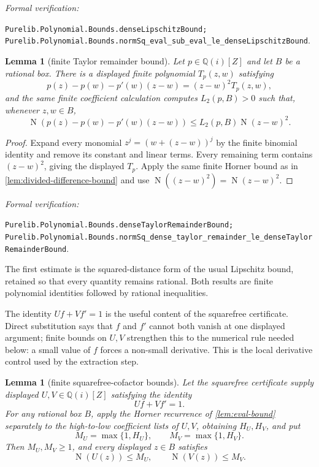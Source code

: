 \documentclass[11pt]{article}
\newtheorem{lemma}[theorem]{Lemma}
\newcommand{\Qi}{\mathbb{Q}(i)}
\newcommand{\Norm}[1]{\operatorname{N}\!\left(#1\right)}
\newcommand{\leanref}[1]{\par\smallskip\noindent
  \emph{Formal verification:}\par\nobreak
  {\raggedright\nolinkurl{#1}.\par}}
\begin{document}
\leanref{Purelib.Polynomial.Bounds.denseLipschitzBound;
Purelib.Polynomial.Bounds.normSq_eval_sub_eval_le_denseLipschitzBound}

\begin{lemma}[finite Taylor remainder bound]
\label{lem:finite-taylor-bound}
Let $p\in\Qi[Z]$ and let $B$ be a rational box.  There is a displayed finite
polynomial $T_p(z,w)$ satisfying
\begin{equation}
\label{eq:taylor}
 p(z)-p(w)-p'(w)(z-w)=(z-w)^2T_p(z,w),
\end{equation}
and the same finite coefficient calculation computes $L_2(p,B)>0$ such
that, whenever $z,w\in B$,
\begin{equation}
\label{eq:lip2}
 \Norm{p(z)-p(w)-p'(w)(z-w)}
       \le L_2(p,B)\Norm{z-w}^2.
\end{equation}
\end{lemma}

\begin{proof}
Expand every monomial $z^j=(w+(z-w))^j$ by the finite binomial identity and
remove its constant and linear terms.  Every remaining term contains
$(z-w)^2$, giving the displayed $T_p$.  Apply the same finite Horner bound as
in \cref{lem:divided-difference-bound} and use
$\Norm{(z-w)^2}=\Norm{z-w}^2$.
\end{proof}

\leanref{Purelib.Polynomial.Bounds.denseTaylorRemainderBound;
Purelib.Polynomial.Bounds.normSq_dense_taylor_remainder_le_denseTaylorRemainderBound}

The first estimate is the squared-distance form of the usual Lipschitz
bound, retained so that every quantity remains rational.  Both results are
finite polynomial identities followed by rational inequalities.

The identity $Uf+Vf'=1$ is the useful content of the squarefree certificate.
Direct substitution says that $f$ and $f'$ cannot both vanish at one
displayed argument; finite bounds on $U,V$ strengthen this to the numerical
rule needed below: a small value of $f$ forces a non-small derivative.  This
is the local derivative control used by the extraction step.

\begin{lemma}[finite squarefree-cofactor bounds]
\label{lem:squarefree-cofactor-bounds}
Let the squarefree certificate supply displayed $U,V\in\Qi[Z]$ satisfying
the identity
\[
                         Uf+Vf'=1.
\]
For any rational box $B$, apply the Horner recurrence of
\cref{lem:eval-bound} separately to the high-to-low coefficient lists of
$U,V$, obtaining $H_U,H_V$, and put
\[
                       M_U=\max\{1,H_U\},
                       \qquad
                       M_V=\max\{1,H_V\}.
\]
Then $M_U,M_V\ge1$, and every displayed $z\in B$ satisfies
\[
                  \Norm{U(z)}\le M_U,
                  \qquad
                  \Norm{V(z)}\le M_V.
\]
\end{lemma}
\end{document}

